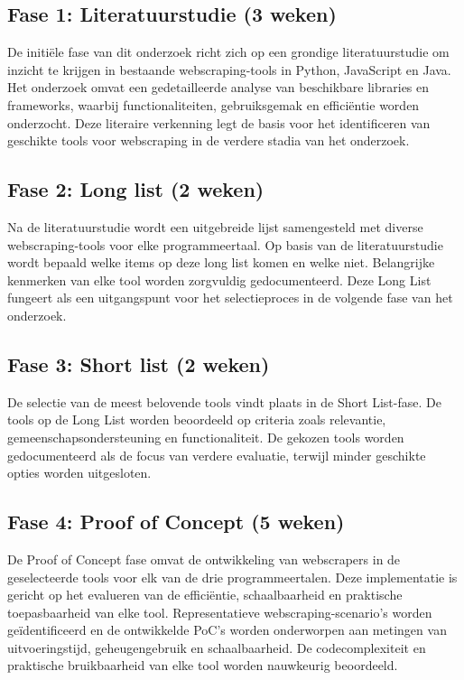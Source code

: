 \subsection{Fase 1: Literatuurstudie (3 weken)}
De initiële fase van dit onderzoek richt zich op een grondige literatuurstudie om inzicht te krijgen in bestaande webscraping-tools in Python,
JavaScript en Java. Het onderzoek omvat een gedetailleerde analyse van beschikbare libraries en frameworks, 
waarbij functionaliteiten, gebruiksgemak en efficiëntie worden onderzocht. Deze literaire verkenning legt de 
basis voor het identificeren van geschikte tools voor webscraping in de verdere stadia van het onderzoek.

\subsection{Fase 2: Long list (2 weken)}
Na de literatuurstudie wordt een uitgebreide lijst samengesteld met diverse webscraping-tools voor elke programmeertaal. 
Op basis van de literatuurstudie wordt bepaald welke items op deze long list komen en welke niet. Belangrijke kenmerken van elke tool 
worden zorgvuldig gedocumenteerd. Deze Long List fungeert als een uitgangspunt voor het selectieproces in de volgende fase 
van het onderzoek.

\subsection{Fase 3: Short list (2 weken)}
De selectie van de meest belovende tools vindt plaats in de Short List-fase. De tools op de Long List worden beoordeeld op 
criteria zoals relevantie, gemeenschapsondersteuning en functionaliteit. 
De gekozen tools worden gedocumenteerd als de focus van verdere evaluatie, terwijl minder geschikte opties 
worden uitgesloten.

\subsection{Fase 4: Proof of Concept (5 weken)}
De Proof of Concept fase omvat de ontwikkeling van webscrapers in de geselecteerde tools voor elk van de drie programmeertalen. 
Deze implementatie is gericht op het evalueren van de efficiëntie, schaalbaarheid en praktische toepasbaarheid van elke tool. 
Representatieve webscraping-scenario's worden geïdentificeerd en de ontwikkelde PoC's worden onderworpen aan metingen van 
uitvoeringstijd, geheugengebruik en schaalbaarheid. De codecomplexiteit en praktische bruikbaarheid van elke tool worden 
nauwkeurig beoordeeld.

